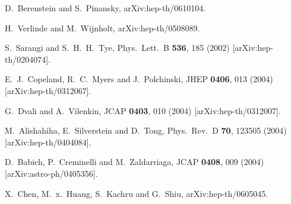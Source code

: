 \documentclass[aps,amsfonts]{ar2e}
\begin{document}
\begin{thebibliography}{999}
  D.~Berenstein and S.~Pinansky,
  arXiv:hep-th/0610104.

  H.~Verlinde and M.~Wijnholt,
  arXiv:hep-th/0508089.

  S.~Sarangi and S.~H.~H.~Tye,
  Phys.\ Lett.\ B {\bf 536}, 185 (2002)
  [arXiv:hep-th/0204074].

  E.~J.~Copeland, R.~C.~Myers and J.~Polchinski,
  JHEP {\bf 0406}, 013 (2004)
  [arXiv:hep-th/0312067].

  G.~Dvali and A.~Vilenkin,
  JCAP {\bf 0403}, 010 (2004)
  [arXiv:hep-th/0312007].

  M.~Alishahiha, E.~Silverstein and D.~Tong,
  Phys.\ Rev.\ D {\bf 70}, 123505 (2004)
  [arXiv:hep-th/0404084].

  D.~Babich, P.~Creminelli and M.~Zaldarriaga,
  JCAP {\bf 0408}, 009 (2004)
  [arXiv:astro-ph/0405356].

  X.~Chen, M.~x.~Huang, S.~Kachru and G.~Shiu,
  arXiv:hep-th/0605045.


\end{thebibliography}
\end{document}
